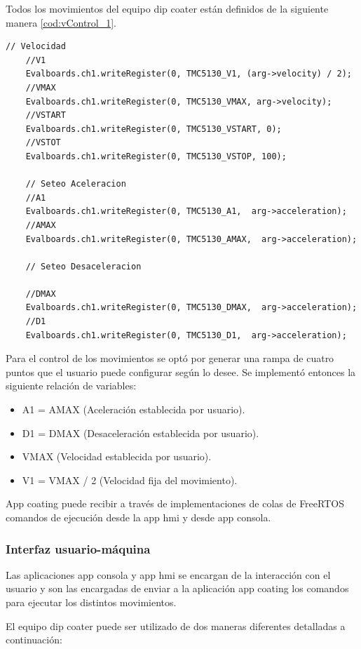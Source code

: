 Todos los movimientos del equipo dip coater están definidos de la siguiente manera \ref{cod:vControl_1}.
\begin{lstlisting}[label=cod:vControl_1,caption=Macros para configurar de desplazamientos.] 
	// Velocidad
	//V1
	Evalboards.ch1.writeRegister(0, TMC5130_V1, (arg->velocity) / 2);
	//VMAX
	Evalboards.ch1.writeRegister(0, TMC5130_VMAX, arg->velocity);
	//VSTART
	Evalboards.ch1.writeRegister(0, TMC5130_VSTART, 0);
	//VSTOT
	Evalboards.ch1.writeRegister(0, TMC5130_VSTOP, 100);

	// Seteo Aceleracion
	//A1
	Evalboards.ch1.writeRegister(0, TMC5130_A1,  arg->acceleration);
	//AMAX
	Evalboards.ch1.writeRegister(0, TMC5130_AMAX,  arg->acceleration);

	// Seteo Desaceleracion

	//DMAX
	Evalboards.ch1.writeRegister(0, TMC5130_DMAX,  arg->acceleration);
	//D1
	Evalboards.ch1.writeRegister(0, TMC5130_D1,  arg->acceleration);
\end{lstlisting}

Para el control de los movimientos se optó por generar una rampa de cuatro puntos que el usuario puede configurar según lo desee. Se implementó entonces la siguiente relación de variables:

\begin{itemize}
\item A1 = AMAX  (Aceleración establecida por usuario).
\item D1 = DMAX  (Desaceleración establecida por usuario).
\item VMAX 	  (Velocidad establecida por usuario).
\item V1 = VMAX / 2 (Velocidad fija del movimiento).

\end{itemize}

 
App coating puede recibir a través de implementaciones de colas de FreeRTOS comandos de ejecución desde la app hmi y desde app consola.

\subsubsection{Interfaz usuario-máquina}


Las aplicaciones app consola y app hmi se encargan de la interacción con el usuario y son las encargadas de enviar a la aplicación app coating los comandos para ejecutar los distintos movimientos.

El equipo dip coater puede ser utilizado de dos maneras diferentes detalladas a continuación:

